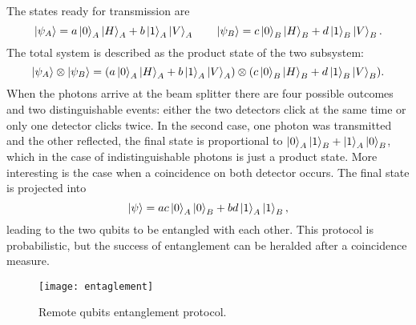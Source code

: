 The states ready for transmission are
\begin{equation}
\ket{\psi_A} = a\ket{0}_A\ket{H}_A + b\ket{1}_A\ket{V}_A \qquad \ket{\psi_B} = c\ket{0}_B\ket{H}_B + d\ket{1}_B\ket{V}_B.
\end{equation}
The total system is described as the product state of the two subsystem:
\begin{equation}
\ket{\psi_A}\otimes \ket{\psi_B} = (a\ket{0}_A\ket{H}_A + b\ket{1}_A\ket{V}_A)\otimes (c\ket{0}_B\ket{H}_B + d\ket{1}_B\ket{V}_B).
\end{equation}
When the photons arrive at the beam splitter there are four possible outcomes and two distinguishable events: either the two detectors click at the same time or only one detector clicks twice. In the second case, one photon was transmitted and the other reflected, the final state is proportional to $\ket{0}_A \ket{1}_B + \ket{1}_A \ket{0}_B$, which in the case of indistinguishable photons  is just a product state. More interesting is the case when a coincidence on both detector occurs. The final state is projected into
\begin{equation}
\ket{\psi} = ac\ket{0}_A \ket{0}_B + bd\ket{1}_A \ket{1}_B,
\end{equation}
leading to the two qubits to be entangled with each other. This protocol is probabilistic, but the success of entanglement can be heralded after a coincidence measure.
\begin{figure}[H]
  \centering
  \texttt{[image: entaglement]}
  \caption{Remote qubits entanglement protocol.}
  \label{remoteentanglement}
\end{figure}



